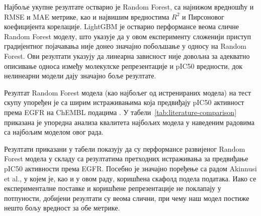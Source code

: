\documentclass[12pt,oneside]{memoir}
\begin{document}
Најбоље укупне резултате остварио је Random Forest, са 
најнижом вредношћу и RMSE и MAE метрике, као и највишим 
вредностима $R^2$ и Пирсоновог коефицијента корелације. 
LightGBM је остварио перформансе веома сличне 
Random Forest моделу, што указује да у овом експерименту 
сложенији приступ градијентног појачавања није донео 
значајно побољшање у односу на Random Forest.
Ови резултати указују да линеарна зависност 
није довољна за адекватно описивање односа између 
молекулске репрезентације и pIC50 вредности, док 
нелинеарни модели дају значајно боље резултате.

Резултат Random Forest модела (као најбољег од истренираних модела) 
на тест скупу упоређен је са
ширим истраживањима која предвиђају pIC50 активност према EGFR
на ChEMBL подацима \cite{Gupta2025,Akinnusi2026}.
У табели~\ref{tab:literature-comparison} приказана је упоредна анализа 
квалитета најбољих модела у наведеним радовима са најбољим моделом овог рада.

\begin{table}[!ht]
  \centering
  \small
  \setlength{\tabcolsep}{3pt}
  \renewcommand{\arraystretch}{1.15}
  \caption{Упоредна анализа модела за предвиђање pIC50 активности
  према EGFR}
  \label{tab:literature-comparison}
\end{table}

Резултати приказани у табели показују да су перформансе развијеног Random Forest модела
у складу са резултатима претходних истраживања за предвиђање 
pIC50 активности према EGFR. Посебно је значајно поређење са радом 
Akinnusi et al., у којем је, као и у овом раду, коришћена скафолд подела 
података. Иако се експерименталне поставке и коришћене 
репрезентације не поклапају у потпуности, добијени резултати су веома 
слични, при чему наш модел постиже нешто бољу вредност за обе метрике.
\end{document}
